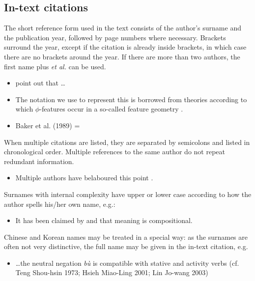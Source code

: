 \documentclass[charis,linguex]{glossa}
\begin{document}
\subsection{In-text citations}

The short reference form used in the text consists of the author’s surname and the publication year, followed by page numbers where necessary. Brackets surround the year, except if the citation is already inside brackets, in which case there are no brackets around the year. If there are more than two authors, the first name plus \textit{et al.} can be used.

\begin{itemize}
\item \citet{murray:1983} point out that \ldots
\item The notation we use to represent this is borrowed from theories according to which $\phi$-features occur in a so-called feature geometry \citep[248-250]{mccarthy:1999}.
\item Baker et al. (1989) = \citet*{baker:1989}
\end{itemize}
When multiple citations are listed, they are separated by semicolons and listed in chronological order. Multiple references to the same author do not repeat redundant information.

\begin{itemize}
\item Multiple authors have belaboured this point \citep{chomsky:1981,chomsky:1986a,chomsky:1986,iverson:1989,casali:1998a,blevins:2004,franks:2005}.
\end{itemize}
Surnames with internal complexity have upper or lower case according to how the author spells his/her own name, e.g.:

\begin{itemize}
\item It has been claimed by \citet{swart:1998} and \citet{belder:2011} that meaning is compositional. 
\end{itemize}
Chinese and Korean names may be treated in a special way: as the surnames are often not very distinctive, the full name may be given in the in-text citation, e.g.

\begin{itemize}
\item  \ldots the neutral negation \textit{bù} is compatible with stative and activity verbs (cf. Teng Shou-hsin 1973; Hsieh Miao-Ling 2001; Lin Jo-wang 2003) %
\end{itemize}
\end{document}
